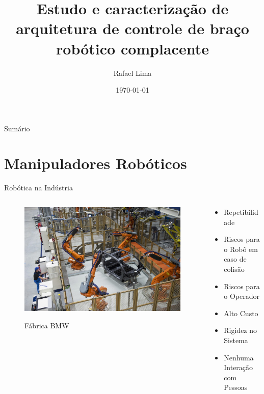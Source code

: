 \documentclass{beamer}
\title{Estudo e caracterização de arquitetura de controle de braço robótico complacente}
\date{\today}
\author{Rafael Lima}
\institute{Universidade de Brasília}
\begin{document}
\maketitle

\begin{frame}{Sumário}
\tableofcontents
\end{frame}


\section{Manipuladores Robóticos}

\begin{frame}{Robótica na Indústria}
\begin{columns}
\begin{column}{0.5\textwidth}
   \begin{figure}
    \centering
    \includegraphics[width = 1.1\linewidth]{tex/figs/robot-factory.jpg}
    \label{fig:mekainside}
    \caption{Fábrica BMW }
\end{figure}
\end{column}
\begin{column}{0.5\textwidth}  %
    \begin{itemize}
        \item Repetibilidade
        \item Riscos para o Robô em caso de colisão
        \item Riscos para o Operador
        \item Alto Custo
        \item Rigidez no Sistema
        \item Nenhuma Interação com Pessoas
    \end{itemize}
\end{column}
\end{columns}
\end{frame}
\end{document}
